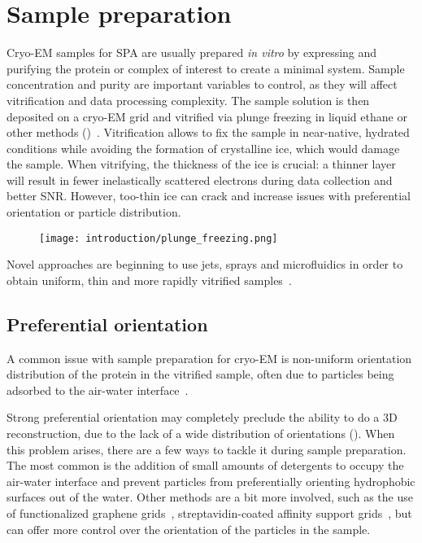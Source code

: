 \section{Sample preparation}\label{em_sample_prep}
Cryo-EM samples for SPA are usually prepared \textit{in vitro} by expressing and purifying the protein or complex of interest to create a minimal system.
Sample concentration and purity are important variables to control, as they will affect vitrification and data processing complexity.
The sample solution is then deposited on a cryo-EM grid and vitrified via plunge freezing in liquid ethane or other methods ()~\cite{dubochetCryoelectronMicroscopyVitrified1988}.
Vitrification allows to fix the sample in near-native, hydrated conditions while avoiding the formation of crystalline ice, which would damage the sample.
When vitrifying, the thickness of the ice is crucial: a thinner layer will result in fewer inelastically scattered electrons during data collection and better SNR.
However, too-thin ice can crack and increase issues with preferential orientation or particle distribution.

\begin{figure}
    \centering
    \texttt{[image: introduction/plunge\_freezing.png]}
    \label{fig:em_plunge_freezing}
\end{figure}

Novel approaches are beginning to use jets, sprays and microfluidics in order to obtain uniform, thin and more rapidly vitrified samples~\cite{geminEasyGridVersatilePlatform2024}.

\subsection{Preferential orientation}\label{em_pref_ori}
A common issue with sample preparation for cryo-EM is non-uniform orientation distribution of the protein in the vitrified sample, often due to particles being adsorbed to the air-water interface~\cite{nobleRoutineSingleParticle2018}.

Strong preferential orientation may completely preclude the ability to do a 3D reconstruction, due to the lack of a wide distribution of orientations ().
When this problem arises, there are a few ways to tackle it during sample preparation.
The most common is the addition of small amounts of detergents to occupy the air-water interface and prevent particles from preferentially orienting hydrophobic surfaces out of the water.
Other methods are a bit more involved, such as the use of functionalized graphene grids~\cite{luFunctionalizedGrapheneGrids2022}, streptavidin-coated affinity support grids~\cite{crucifixImmobilizationBiotinylatedDNA2004,hanLongShelflifeStreptavidin2016}, but can offer more control over the orientation of the particles in the sample.

